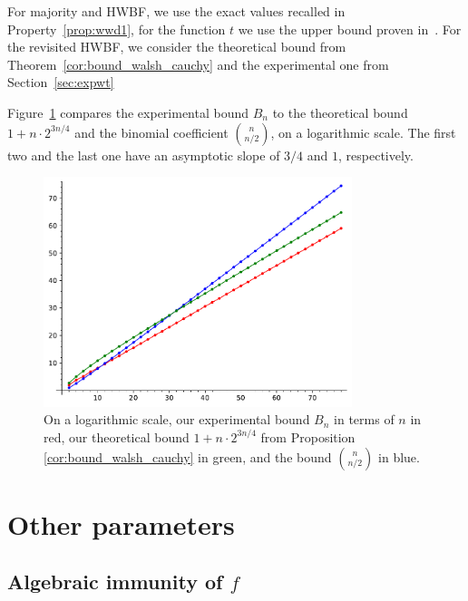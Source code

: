 \documentclass[11pt]{llncs}
\begin{document}
For majority and HWBF, we use the exact values recalled in Property~\ref{prop:wwd1}, for the function $t$ we use the upper bound proven in~\cite{DAM:MeaOza24}. 
For the revisited HWBF, we consider the theoretical bound from Theorem~\ref{cor:bound_walsh_cauchy} and the experimental one from Section~\ref{sec:expwt}





Figure~\ref{fig:walsh_bound_comparison} compares the experimental bound $B_n$ to the theoretical bound $1+n\cdot 2^{3n/4}$ and the binomial coefficient $\binom{n}{n/2}$, on a logarithmic scale. The first two and the last one have an asymptotic slope of $3/4$ and $1$, respectively.


\begin{figure}
	\centering
	\includegraphics[width=9cm]{comparison_walsh_bound.pdf}
	\caption{On a logarithmic scale, our experimental bound $B_n$ in terms of $n$ in red, our theoretical bound $1+n\cdot 2^{3n/4}$ from Proposition \ref{cor:bound_walsh_cauchy} in green, and the bound $\binom{n}{n/2}$ in blue.}
	\label{fig:walsh_bound_comparison}
\end{figure}






\section{Other parameters}
\subsection{Algebraic immunity of $f$}
\end{document}
